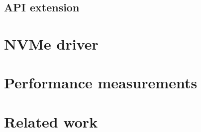\subsection{API extension}

\section{NVMe driver}\label{sec:nvme}


\section{Performance measurements}\label{sec:eval}

\section{Related work}\label{sec:rw}
